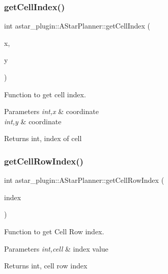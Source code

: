 \subsubsection{\texorpdfstring{get\+Cell\+Index()}{getCellIndex()}}
{\footnotesize\ttfamily int astar\+\_\+plugin\+::\+A\+Star\+Planner\+::get\+Cell\+Index (\begin{DoxyParamCaption}\item[{float}]{x,  }\item[{float}]{y }\end{DoxyParamCaption})}



Function to get cell index. 


\begin{DoxyParams}{Parameters}
{\em int,x} & coordinate \\
\hline
{\em int,y} & coordinate \\
\hline
\end{DoxyParams}
\begin{DoxyReturn}{Returns}
int, index of cell 
\end{DoxyReturn}
\mbox{\label{classastar__plugin_1_1_a_star_planner_a660c014cd14a8de3080b138b44f5437e}} 
\subsubsection{\texorpdfstring{get\+Cell\+Row\+Index()}{getCellRowIndex()}}
{\footnotesize\ttfamily int astar\+\_\+plugin\+::\+A\+Star\+Planner\+::get\+Cell\+Row\+Index (\begin{DoxyParamCaption}\item[{int}]{index }\end{DoxyParamCaption})}



Function to get Cell Row index. 


\begin{DoxyParams}{Parameters}
{\em int,cell} & index value \\
\hline
\end{DoxyParams}
\begin{DoxyReturn}{Returns}
int, cell row index 
\end{DoxyReturn}
\mbox{\label{classastar__plugin_1_1_a_star_planner_a875990bd4b8b9ab17855ce54b4df4780}} 
